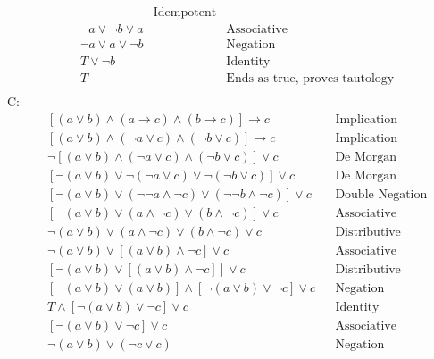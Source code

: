 \documentclass[10pt]{exam}
\begin{document}
\begin{questions}
\begin{solution}
\begin{align*}
        && \text{Idempotent} \\[2pt]
        &\lnot a \lor \lnot b \lor a
        && \text{Associative} \\[2pt]
        &\lnot a \lor a \lor \lnot b
        && \text{Negation} \\[2pt]
        &T \lor \lnot b
        && \text{Identity} \\[2pt]
        &T
        && \text{Ends as true, proves tautology} \\[2pt]
    \end{align*}
    C: 
    \begin{align*}
        &[(a \lor b) \land (a \rightarrow c) \land (b \rightarrow c)] \rightarrow c
        && \text{Implication} \\[2pt]
        &[(a \lor b) \land (\lnot a \lor c) \land (\lnot b \lor c)] \rightarrow c
        && \text{Implication} \\[2pt]
        &\lnot[(a \lor b) \land (\lnot a \lor c) \land (\lnot b \lor c)] \lor c
        && \text{De Morgan} \\[2pt]
        &[\lnot(a \lor b) \lor \lnot(\lnot a \lor c) \lor \lnot(\lnot b \lor c)] \lor c
        && \text{De Morgan} \\[2pt]
        &[\lnot(a \lor b) \lor (\lnot\lnot a \land \lnot c) \lor (\lnot\lnot b \land \lnot c)] \lor c
        && \text{Double Negation} \\[2pt]
        &[\lnot(a \lor b) \lor (a \land \lnot c) \lor (b \land \lnot c)] \lor c
        && \text{Associative} \\[2pt]
        &\lnot(a \lor b) \lor (a \land \lnot c) \lor (b \land \lnot c) \lor c
        && \text{Distributive} \\[2pt]
        &\lnot(a \lor b) \lor [(a \lor b) \land \lnot c] \lor c
        && \text{Associative} \\[2pt]
        &[\lnot(a \lor b) \lor [(a \lor b) \land \lnot c]] \lor c
        && \text{Distributive} \\[2pt]
        &[\lnot(a \lor b) \lor (a \lor b)] \land [\lnot(a \lor b) \lor \lnot c] \lor c
        && \text{Negation} \\[2pt]
        &T \land [\lnot(a \lor b) \lor \lnot c] \lor c
        && \text{Identity} \\[2pt]
        &[\lnot(a \lor b) \lor \lnot c] \lor c
        && \text{Associative} \\[2pt]
        &\lnot(a \lor b) \lor (\lnot c \lor c)
        && \text{Negation} \\[2pt]

\end{align*}
\end{solution}
\end{questions}
\end{document}
